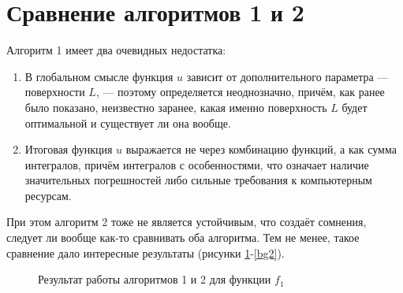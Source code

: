 \documentclass[a4paper, 12pt]{article}
\begin{document}
\section{Сравнение алгоритмов 1 и 2}
Алгоритм 1 имеет два очевидных недостатка:
\begin{enumerate}
  \item В глобальном смысле функция $u$ зависит от дополнительного параметра --- поверхности $L$, --- поэтому определяется неоднозначно, причём, как ранее было показано,
  неизвестно заранее, какая именно поверхность $L$ будет оптимальной и существует ли она вообще.
  \item Итоговая функция $u$ выражается не через комбинацию функций, а как сумма интегралов, причём интегралов с особенностями, что означает наличие значительных погрешностей либо сильные требования к компьютерным ресурсам.  
\end{enumerate}
При этом алгоритм 2 тоже не является устойчивым, что создаёт сомнения, следует ли вообще как-то сравнивать оба алгоритма.
Тем не менее, такое сравнение дало интересные результаты (рисунки \ref{bg1}-\ref{bg2}).

\begin{figure}[h]
  \begin{minipage}[h]{\linewidth}
  \end{minipage}
  \vfill
  \begin{minipage}[h]{\linewidth}
  \end{minipage}
  \caption{Результат работы алгоритмов 1 и 2 для функции $f_1$}
  \label{bg1}
  \end{figure}
\end{document}
